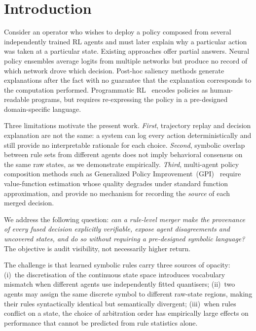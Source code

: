 \documentclass[12pt]{article}
\begin{document}
\tableofcontents
\newpage

\section{Introduction}
\label{sec:intro}

Consider an operator who wishes to deploy a policy composed from several
independently trained RL agents and must later explain why a particular action
was taken at a particular state.
Existing approaches offer partial answers.
Neural policy ensembles average logits from multiple networks but produce
no record of which network drove which decision.
Post-hoc saliency methods generate explanations after the fact with no
guarantee that the explanation corresponds to the computation performed.
Programmatic RL~\citep{verma2018pirl} encodes policies as human-readable
programs, but requires re-expressing the policy in a pre-designed
domain-specific language.

Three limitations motivate the present work.
\emph{First}, trajectory replay and decision explanation are not the same:
a system can log every action deterministically and still provide no
interpretable rationale for each choice.
\emph{Second}, symbolic overlap between rule sets from different agents
does not imply behavioral consensus on the same raw states, as we demonstrate
empirically.
\emph{Third}, multi-agent policy composition methods such as Generalized
Policy Improvement~(GPI)~\citep{barreto2017successor} require value-function
estimation whose quality degrades under standard function approximation, and
provide no mechanism for recording the \emph{source} of each merged decision.

We address the following question: \emph{can a rule-level merger make the
provenance of every fused decision explicitly verifiable, expose agent
disagreements and uncovered states, and do so without requiring a
pre-designed symbolic language?}
The objective is audit visibility, not necessarily higher return.

The challenge is that learned symbolic rules carry three sources of opacity:
(i)~the discretisation of the continuous state space introduces vocabulary
mismatch when different agents use independently fitted quantisers;
(ii)~two agents may assign the same discrete symbol to different raw-state
regions, making their rules syntactically identical but semantically
divergent;
(iii)~when rules conflict on a state, the choice of arbitration order
has empirically large effects on performance that cannot be predicted from
rule statistics alone.
\end{document}

